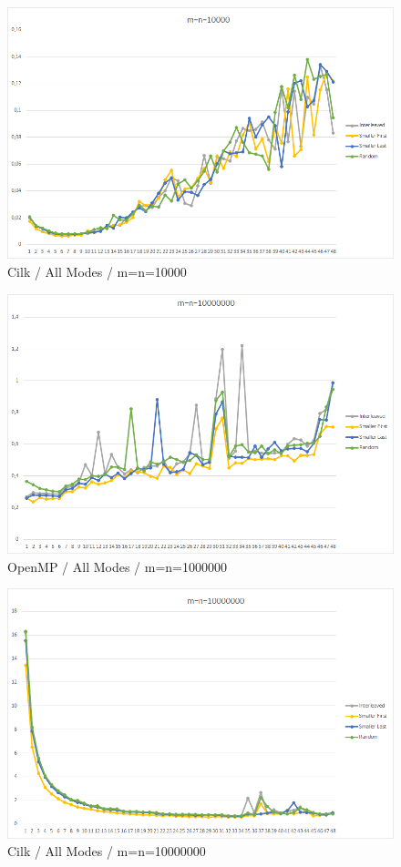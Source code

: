 \documentclass[12pt,a4paper,titlepage,oneside]{scrartcl}
\begin{document}
\begin{figure}[h]
\includegraphics[width=\linewidth]{Saturn_Cilk_10000}
\caption{Cilk / All Modes / m=n=10000}
\end{figure}

\begin{figure}[h]
\includegraphics[width=\linewidth]{Saturn_OpenMP_10000000}
\caption{OpenMP / All Modes / m=n=1000000}
\end{figure}

\begin{figure}[h]
\includegraphics[width=\linewidth]{Saturn_Cilk_10000000}
\caption{Cilk / All Modes / m=n=10000000}
\end{figure}
\end{document}
